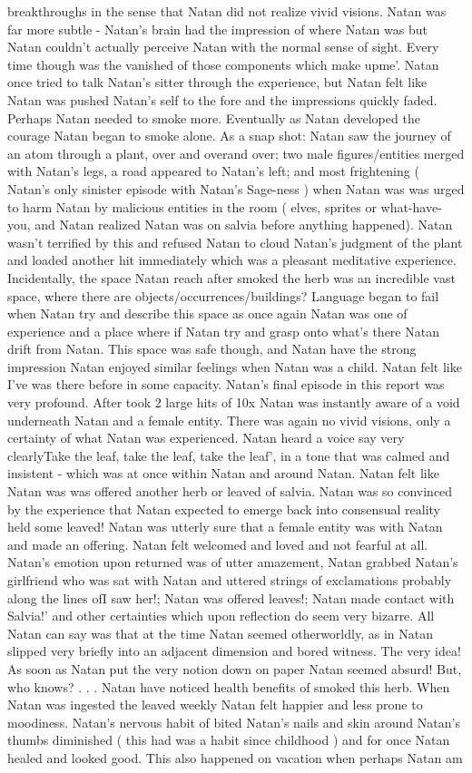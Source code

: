 \documentclass[12pt]{book}
\begin{document}
breakthroughs in the sense that Natan did not realize vivid visions. Natan was far more subtle - Natan's brain had the impression of where Natan was but Natan couldn't actually perceive Natan with the normal sense of sight. Every time though was the vanished of those components which make upme'. Natan once tried to talk Natan's sitter through the experience, but Natan felt like Natan was pushed Natan's self to the fore and the impressions quickly faded. Perhaps Natan needed to smoke more. Eventually as Natan developed the courage Natan began to smoke alone. As a snap shot: Natan saw the journey of an atom through a plant, over and overand over; two male figures/entities merged with Natan's legs, a road appeared to Natan's left; and most frightening ( Natan's only sinister episode with Natan's Sage-ness ) when Natan was was urged to harm Natan by malicious entities in the room ( elves, sprites or what-have-you, and Natan realized Natan was on salvia before anything happened). Natan wasn't terrified by this and refused Natan to cloud Natan's judgment of the plant and loaded another hit immediately which was a pleasant meditative experience. Incidentally, the space Natan reach after smoked the herb was an incredible vast space, where there are objects/occurrences/buildings? Language began to fail when Natan try and describe this space as once again Natan was one of experience and a place where if Natan try and grasp onto what's there Natan drift from Natan. This space was safe though, and Natan have the strong impression Natan enjoyed similar feelings when Natan was a child. Natan felt like I've was there before in some capacity. Natan's final episode in this report was very profound. After took 2 large hits of 10x Natan was instantly aware of a void underneath Natan and a female entity. There was again no vivid visions, only a certainty of what Natan was experienced. Natan heard a voice say very clearlyTake the leaf, take the leaf, take the leaf', in a tone that was calmed and insistent - which was at once within Natan and around Natan. Natan felt like Natan was was offered another herb or leaved of salvia. Natan was so convinced by the experience that Natan expected to emerge back into consensual reality held some leaved! Natan was utterly sure that a female entity was with Natan and made an offering. Natan felt welcomed and loved and not fearful at all. Natan's emotion upon returned was of utter amazement, Natan grabbed Natan's girlfriend who was sat with Natan and uttered strings of exclamations probably along the lines ofI saw her!; Natan was offered leaves!; Natan made contact with Salvia!' and other certainties which upon reflection do seem very bizarre. All Natan can say was that at the time Natan seemed otherworldly, as in Natan slipped very briefly into an adjacent dimension and bored witness. The very idea! As soon as Natan put the very notion down on paper Natan seemed absurd! But, who knows? . . .  Natan have noticed health benefits of smoked this herb. When Natan was ingested the leaved weekly Natan felt happier and less prone to moodiness. Natan's nervous habit of bited Natan's nails and skin around Natan's thumbs diminished ( this had was a habit since childhood ) and for once Natan healed and looked good. This also happened on vacation when perhaps Natan am 
\end{document}
